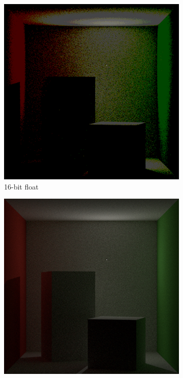 \begin{figure}[]
    \centering
    \begin{subfigure}[b]{0.48\textwidth}
        \centering
        \includegraphics[width=\textwidth]{images/03-floating_point16.jpg}
        \caption{16-bit float}
        \label{fig:methods_float16}
    \end{subfigure}
    \hfill
    \begin{subfigure}[b]{0.48\textwidth}
        \centering
        \includegraphics[width=\textwidth]{images/03-floating_point32.jpg}

\end{subfigure}
\end{figure}

